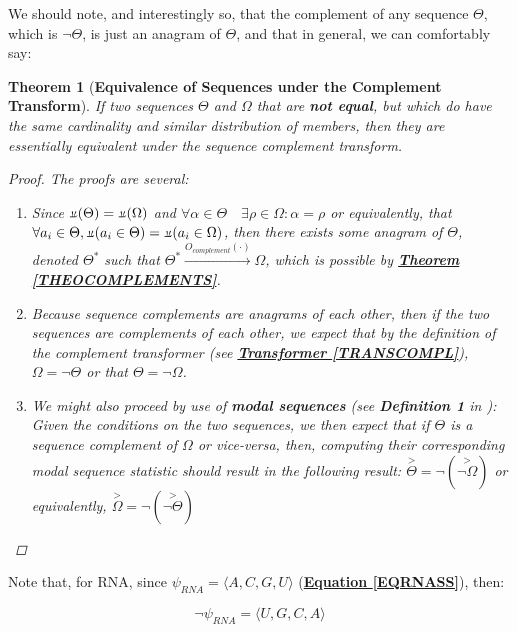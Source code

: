 \documentclass[a4paper, 18pt]{book} %
\newtheorem{theo}{Theorem}
\newcommand{\invpi}{\rotatebox[origin=c]{180}{$\pi$}}
\begin{document}
We should note, and interestingly so, that the complement of any sequence $\Theta$, which is $\lnot\Theta$, is just an anagram of $\Theta$, and that in general, we can comfortably say:


\begin{theo}[\textbf{Equivalence of Sequences under the Complement Transform}]
\label{THEOCOMPEQUIV}
If two sequences $\Theta$ and $\Omega$ that are \textbf{not equal}, but which do have the same cardinality and similar distribution of members, then they are essentially equivalent under the sequence complement transform.

\begin{proof}
The proofs are several:
\begin{enumerate}
\item Since $\invpi(\Theta) = \invpi(\Omega)$ and $\forall \alpha \in \Theta \quad \exists \rho \in \Omega: \alpha = \rho$ or equivalently, that $\forall a_i \in \Theta, \invpi(a_i \in \Theta) = \invpi(a_i \in \Omega)$, then there exists some anagram of $\Theta$, denoted $\Theta^*$ such that $\Theta^* \xrightarrow{O_{complement}(\cdot)} \Omega$, which is possible by \textbf{\hyperref[THEOCOMPLEMENTS]{Theorem \ref{THEOCOMPLEMENTS}}}.
\item Because sequence complements are anagrams of each other, then if the two sequences are complements of each other, we expect that by the definition of the complement transformer (see \textbf{\hyperref[TRANSCOMPL]{Transformer \ref{TRANSCOMPL}}}), $\Omega = \lnot\Theta$ or that $\Theta = \lnot\Omega$.
\item We might also proceed by use of \textbf{modal sequences} (see \textbf{Definition 1} in \cite{transformatics}): Given the conditions on the two sequences, we then expect that if $\Theta$ is a sequence complement of $\Omega$ or vice-versa, then, computing their corresponding modal sequence statistic should result in the following result: $\overset{>}{\Theta} = \lnot(\overset{>}{\lnot\Omega})$ or equivalently, $\overset{>}{\Omega} = \lnot(\overset{>}{\lnot\Theta})$
\end{enumerate}
\end{proof}

\end{theo}


Note that, for RNA, since $\psi_{RNA} = \langle A, C, G, U \rangle$ (\textbf{\hyperref[EQRNASS]{Equation \ref{EQRNASS}}}), then: 

\begin{equation}
\label{EQRNACOMP}
\lnot\psi_{RNA} = \langle U, G, C, A \rangle
\end{equation}
\end{document}
